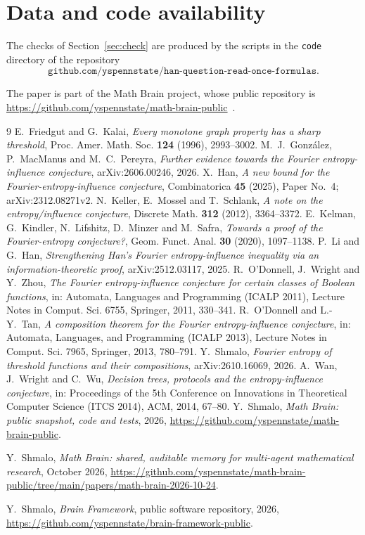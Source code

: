 \documentclass[11pt]{amsart}
\theoremstyle{definition}\newtheorem{definition}[theorem]{Definition}
\theoremstyle{remark}\newtheorem{remark}[theorem]{Remark}
\begin{document}
\section*{Data and code availability}

The checks of Section~\ref{sec:check} are produced by the scripts in the \texttt{code} directory of the repository
\[
\texttt{github.com/yspennstate/han-question-read-once-formulas}.
\]

The paper is part of the Math Brain project, whose public repository is \url{https://github.com/yspennstate/math-brain-public}~\cite{MathBrainRepo}.

\begin{thebibliography}{9}
 E.~Friedgut and G.~Kalai, \emph{Every monotone graph property has a sharp threshold}, Proc. Amer. Math.
Soc. \textbf{124} (1996), 2993--3002.
 M.~J.~Gonz\'alez, P.~MacManus and M.~C.~Pereyra, \emph{Further evidence towards the Fourier
entropy-influence conjecture}, arXiv:2606.00246, 2026.
 X.~Han, \emph{A new bound for the Fourier-entropy-influence conjecture}, Combinatorica \textbf{45}
(2025), Paper No.~4; arXiv:2312.08271v2.
 N.~Keller, E.~Mossel and T.~Schlank, \emph{A note on the entropy/influence conjecture}, Discrete Math.
\textbf{312} (2012), 3364--3372.
 E.~Kelman, G.~Kindler, N.~Lifshitz, D.~Minzer and M.~Safra, \emph{Towards a proof of the
Fourier-entropy conjecture?}, Geom. Funct. Anal. \textbf{30} (2020), 1097--1138.
 P.~Li and G.~Han, \emph{Strengthening Han's Fourier entropy-influence inequality via an
information-theoretic proof}, arXiv:2512.03117, 2025.
 R.~O'Donnell, J.~Wright and Y.~Zhou, \emph{The Fourier entropy-influence conjecture for certain
classes of Boolean functions}, in: Automata, Languages and Programming (ICALP 2011), Lecture Notes in Comput. Sci.
6755, Springer, 2011, 330--341.
 R.~O'Donnell and L.-Y.~Tan, \emph{A composition theorem for the Fourier entropy-influence conjecture},
in: Automata, Languages, and Programming (ICALP 2013), Lecture Notes in Comput. Sci. 7965, Springer, 2013, 780--791.
 Y.~Shmalo, \emph{Fourier entropy of threshold functions and their compositions}, arXiv:2610.16069,
2026.
 A.~Wan, J.~Wright and C.~Wu, \emph{Decision trees, protocols and the entropy-influence conjecture},
in: Proceedings of the 5th Conference on Innovations in Theoretical Computer Science (ITCS 2014), ACM, 2014, 67--80.
 Y.~Shmalo, \emph{Math Brain: public snapshot, code and tests}, 2026, \url{https://github.com/yspennstate/math-brain-public}.

 Y.~Shmalo, \emph{Math Brain: shared, auditable memory for multi-agent mathematical research}, October 2026, \url{https://github.com/yspennstate/math-brain-public/tree/main/papers/math-brain-2026-10-24}.

 Y.~Shmalo, \emph{Brain Framework}, public software repository, 2026, \url{https://github.com/yspennstate/brain-framework-public}.

\end{thebibliography}
\end{document}
